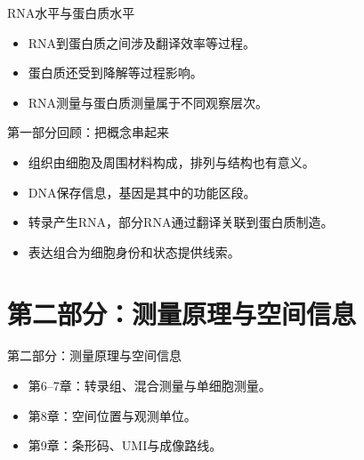\begin{frame}{RNA水平与蛋白质水平}\relax
\begin{itemize}\wideitems
\item RNA到蛋白质之间涉及翻译效率等过程。
\item 蛋白质还受到降解等过程影响。
\item RNA测量与蛋白质测量属于不同观察层次。
\end{itemize}
\end{frame}

\begin{frame}{第一部分回顾：把概念串起来}\relax
\begin{itemize}\wideitems
\item 组织由细胞及周围材料构成，排列与结构也有意义。
\item DNA保存信息，基因是其中的功能区段。
\item 转录产生RNA，部分RNA通过翻译关联到蛋白质制造。
\item 表达组合为细胞身份和状态提供线索。
\end{itemize}
\end{frame}

\section{第二部分：测量原理与空间信息}

\begin{frame}{第二部分：测量原理与空间信息}\relax
{}\begin{itemize}\wideitems
\item 第6--7章：转录组、混合测量与单细胞测量。
\item 第8章：空间位置与观测单位。
\item 第9章：条形码、UMI与成像路线。
\end{itemize}
\end{frame}

